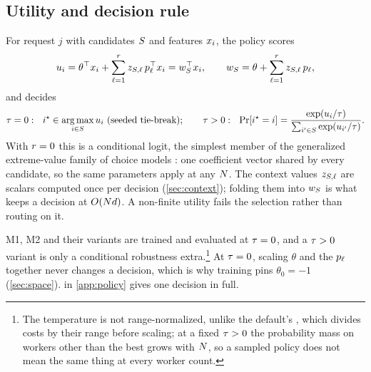 \subsection{Utility and decision rule}
\label{sec:utility}

For request $j$ with candidates $S$ and features $x_i$, the policy scores
\begin{equation}
  \label{eq:utility}
  u_i = \theta^{\top}x_i + \sum_{\ell=1}^{r} z_{S,\ell}\, p_{\ell}^{\top}x_i
          = w_{S}^{\top}x_i,
  \qquad w_{S} = \theta + \sum_{\ell=1}^{r} z_{S,\ell}\, p_{\ell},
\end{equation}
and decides
\begin{equation}
  \label{eq:decision}
  \temp = 0:\ \ i^{\star} \in \argmax_{i \in \cand} \util_i \ \text{(seeded tie-break)};
  \qquad
  \temp > 0:\ \ \Pr[i^{\star} = i] = \frac{\exp(\util_i/\temp)}{\sum_{i' \in \cand}\exp(\util_{i'}/\temp)} .
\end{equation}
With $r = 0$ this is a conditional logit, the simplest member of the generalized
extreme-value family of choice models \citep{train2009gev}: one coefficient vector shared by every
candidate, so the same parameters apply at any $N$. The
context values $z_{S,\ell}$ are scalars computed once per decision
(\cref{sec:context}); folding them into $w_{S}$ is what keeps a decision at $O(Nd)$. A
non-finite utility fails the selection rather than routing on it.

M1, M2 and their variants are trained and evaluated at $\tau = 0$, and a $\tau > 0$ variant is
only a conditional robustness extra.\footnote{The temperature is not range-normalized, unlike the
  default's , which divides costs by their range before scaling; at a
  fixed $\tau > 0$ the probability mass on workers other than the best grows with $N$, so a
  sampled policy does not mean the same thing at every worker count.}
At $\tau = 0$, scaling $\theta$ and the $p_\ell$ together never changes a decision, which is why
training pins $\theta_0 = -1$ (\cref{sec:space}).
 in \cref{app:policy} gives one decision in full.

